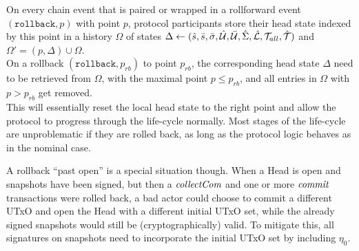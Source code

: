 \quad On every chain event that is paired or
wrapped in a rollforward event $(\mathtt{rollback},p)$ with point $p$, protocol
participants store their head state indexed by this point in a history
$\Omega$ of states
$\Delta \gets (\hat s, \bar s, \bar{\sigma}, \hat {\mathcal U}, \bar {\mathcal U}, \hat{\Sigma}, \hat {\mathcal L}, {\mathcal T}_{all}, \hat {\mathcal T})$ and $\Omega' = (p, \Delta) \cup \Omega$. \\

\quad On a rollback
$(\mathtt{rollback},p_{rb})$ to point $p_{rb}$, the corresponding head state
$\Delta$ need to be retrieved from $\Omega$, with the maximal point
$p \leq p_{rb}$, and all entries in $\Omega$ with $p > p_{rb}$ get removed. \\

This will essentially reset the local head state to the right point and allow
the protocol to progress through the life-cycle normally. Most stages of the
life-cycle are unproblematic if they are rolled back, as long as the protocol
logic behaves as in the nominal case.

A rollback ``past open'' is a special situation though. When a Head is open and
snapshots have been signed, but then a $\textit{collectCom}$ and one or more
$\textit{commit}$ transactions were rolled back, a bad actor could choose to commit a
different UTxO and open the Head with a different initial UTxO set, while the
already signed snapshots would still be (cryptographically) valid. To mitigate
this, all signatures on snapshots need to incorporate the initial UTxO set by
including $\eta_{0}$.





